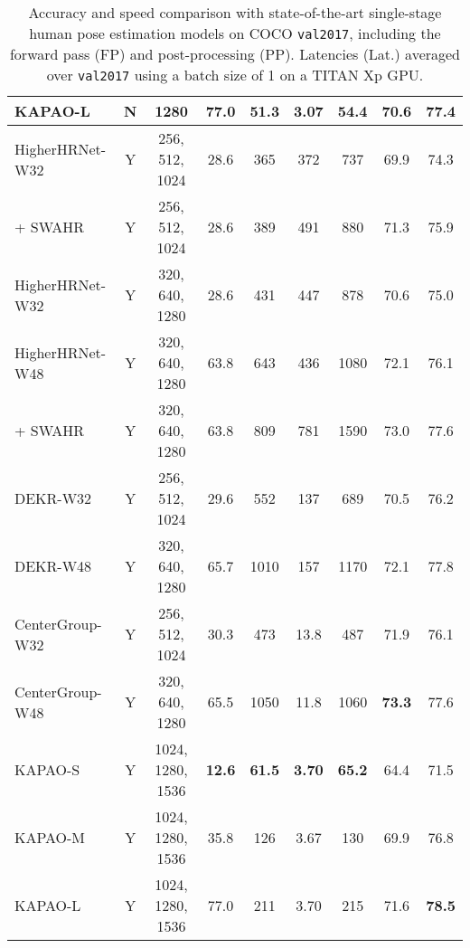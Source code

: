 \documentclass[runningheads]{llncs}
\newcommand\hll[1]{\bgroup
  \hskip0pt\color{black}#1\egroup
}
\begin{document}
\begin{table}[t]
\begin{tabular}{l|c|c|c|cc|c|c|c}
	KAPAO-L & N & 1280 & 77.0  & 51.3 & 3.07 & 54.4 & \textbf{70.6} & \textbf{77.4} \\
	\hline
	HigherHRNet-W32~\cite{cheng2020higherhrnet} & Y & 256, 512, 1024 & 28.6 & 365 & 372 & 737 & 69.9 & 74.3\\  \hll{\quad + SWAHR~\cite{luo2021rethinking}} & Y & 256, 512, 1024 & 28.6 & 389 & 491 & 880 & 71.3 & 75.9\\
HigherHRNet-W32~\cite{cheng2020higherhrnet} & Y & 320, 640, 1280 & 28.6 & 431 & 447 & 878 & 70.6 & 75.0\\  HigherHRNet-W48~\cite{cheng2020higherhrnet} & Y & 320, 640, 1280 & 63.8 & 643 & 436 & 1080 & 72.1 & 76.1\\  \hll{\quad + SWAHR~\cite{luo2021rethinking}} & Y & 320, 640, 1280 & 63.8 & 809 & 781 & 1590 & 73.0 & 77.6\\
DEKR-W32~\cite{geng2021bottom} & Y & 256, 512, 1024 & 29.6 & 552 & 137 & 689 & 70.5 & 76.2\\  DEKR-W48~\cite{geng2021bottom} & Y & 320, 640, 1280 & 65.7 & 1010 & 157 & 1170 & 72.1 & 77.8\\
	\hll{CenterGroup-W32~\cite{braso2021center}} & Y & 256, 512, 1024 & 30.3 & 473 & 13.8 & 487 & 71.9 & 76.1\\
\hll{CenterGroup-W48~\cite{braso2021center}} & Y & 320, 640, 1280 & 65.5 & 1050 & 11.8 & 1060 & \textbf{73.3} & 77.6\\
KAPAO-S & Y & 1024, 1280, 1536 & \textbf{12.6} & \textbf{61.5} & \textbf{3.70} & \textbf{65.2} & 64.4 & 71.5\\  KAPAO-M & Y & 1024, 1280, 1536 & 35.8 & 126 & 3.67 & 130 & 69.9 & 76.8 \\
	KAPAO-L & Y & 1024, 1280, 1536 & 77.0 & 211 & 3.70 & 215 & 71.6 & \textbf{78.5} \\
	\hline
\end{tabular}
\smallskip
\caption{Accuracy and speed comparison with state-of-the-art single-stage human pose estimation models on COCO \texttt{val2017}, including the forward pass (FP) and post-processing (PP). Latencies (Lat.) averaged over \texttt{val2017} using a batch size of 1 on a TITAN Xp GPU.} 
\label{tab:kapao_coco_val}
\end{table}
\end{document}
